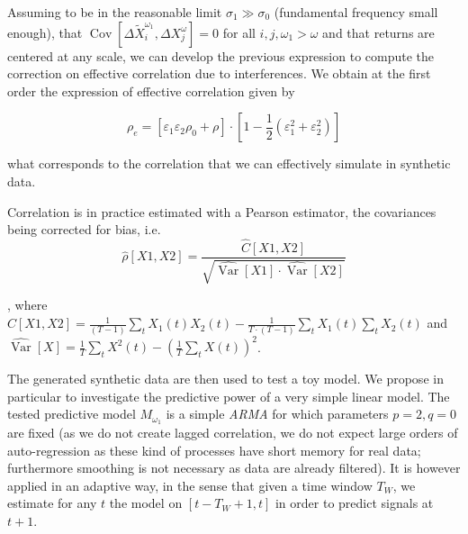 \documentclass{bmcart}
\DeclareMathOperator{\Cov}{Cov}
\DeclareMathOperator{\Var}{Var}
\newcommand{\Covb}[2]{\ensuremath{\Cov\!\left[#1,#2\right]}}
\begin{document}
Assuming to be in the reasonable limit $\sigma_1 \gg \sigma_0$ (fundamental frequency small enough), that $\Covb{\Delta \tilde{X}_i^{\omega_1}}{\Delta X_j^{\omega}}=0$ for all $i,j,\omega_1 > \omega$ and that returns are centered at any scale, we can develop the previous expression to compute the correction on effective correlation due to interferences. We obtain at the first order the expression of effective correlation given by


\begin{equation}
\label{eq:eff_corr}
\rho_e = \left[ \varepsilon_1 \varepsilon_2 \rho_0 + \rho \right] \cdot \left[ 1 - \frac{1}{2}\left(\varepsilon_1^2 + \varepsilon_2^2 \right) \right]
\end{equation}

{\noindent}what corresponds to the correlation that we can effectively simulate in synthetic data.

Correlation is in practice estimated with a Pearson estimator, the covariances being corrected for bias, i.e.
\[
\hat{\rho}[X1,X2] = \frac{\hat{C}[X1,X2]}{\sqrt{\hat{\Var{}}[X1] \cdot \hat{\Var{}}[X2]}}
\]

, where $\hat{C}[X1,X2] = \frac{1}{(T-1)}\sum_{t} X_1(t)X_2(t) - \frac{1}{T\cdot (T-1)} \sum_t X_1(t) \sum_t X_2(t)$ and $\hat{\Var{}}[X] = \frac{1}{T}\sum_t{X^2(t)}-\left(\frac{1}{T}\sum_tX(t)\right)^2$.


The generated synthetic data are then used to test a toy model. We propose in particular to investigate the predictive power of a very simple linear model. The tested predictive model $M_{\omega_1}$ is a simple \emph{ARMA} for which parameters $p=2,q=0$ are fixed (as we do not create lagged correlation, we do not expect large orders of auto-regression as these kind of processes have short memory for real data; furthermore smoothing is not necessary as data are already filtered). It is however applied in an adaptive way, in the sense that given a time window $T_W$, we estimate for any $t$ the model on $[t-T_W+1,t]$ in order to predict signals at $t+1$.

\end{document}
